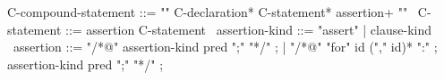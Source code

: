 \begin{syntax}
  C-compound-statement ::= "{" C-declaration* C-statement* assertion+ "}"
        \
  C-statement ::= assertion C-statement \
  assertion-kind ::= "assert" | clause-kind \
  assertion ::= "/*@" assertion-kind pred ";" "*/" ;
  | "/*@" "for" id ("," id)* ":" ;
      assertion-kind pred ";" "*/" ;
\end{syntax}
